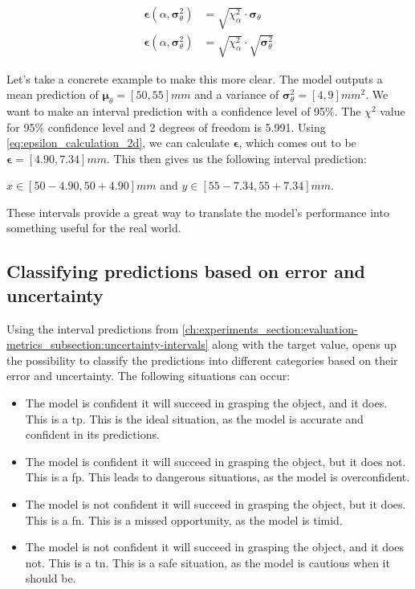 \begin{subequations}\label{eq:epsilon_calculation_2d}
    \begin{align}
        \bm{\epsilon}(\alpha, \bm{\sigma}^2_\theta) &= \sqrt{\chi^2_\alpha} \cdot \bm{\sigma}_\theta \\
        \bm{\epsilon}(\alpha, \bm{\sigma}^2_\theta) &= \sqrt{\chi^2_\alpha} \cdot \sqrt{\bm{\sigma}^2_\theta}
    \end{align}
\end{subequations}

Let's take a concrete example to make this more clear.
The model outputs a mean prediction of $\bm{\mu}_\theta=[50, 55]mm$ and a variance of $\bm{\sigma}^2_\theta=[4, 9]mm^2$.
We want to make an interval prediction with a confidence level of 95\%.
The $\chi^2$ value for 95\% confidence level and 2 degrees of freedom is 5.991.
Using \cref{eq:epsilon_calculation_2d}, we can calculate $\bm{\epsilon}$, which comes out to be $\bm{\epsilon}=[4.90, 7.34]mm$.
This then gives us the following interval prediction: 

$x \in [50 - 4.90, 50 + 4.90]mm$ and $y \in [55 - 7.34, 55 + 7.34]mm$.

These intervals provide a great way to translate the model's performance into something useful for the real world.

\subsection{Classifying predictions based on error and uncertainty}\label{ch:experiments_section:evaluation-metrics_subsection:classifying-predictions-based-on-error-and-uncertainty}
Using the interval predictions from \cref{ch:experiments_section:evaluation-metrics_subsection:uncertainty-intervals} along with the target value, opens up the possibility to classify the predictions into different categories based on their error and uncertainty.
The following situations can occur:

\begin{itemize}
    \item The model is confident it will succeed in grasping the object, and it does. This is a \gls{tp}. This is the ideal situation, as the model is accurate and confident in its predictions.
    \item The model is confident it will succeed in grasping the object, but it does not. This is a \gls{fp}. This leads to dangerous situations, as the model is overconfident.
    \item The model is not confident it will succeed in grasping the object, but it does. This is a \gls{fn}. This is a missed opportunity, as the model is timid.
    \item The model is not confident it will succeed in grasping the object, and it does not. This is a \gls{tn}. This is a safe situation, as the model is cautious when it should be.
\end{itemize}

